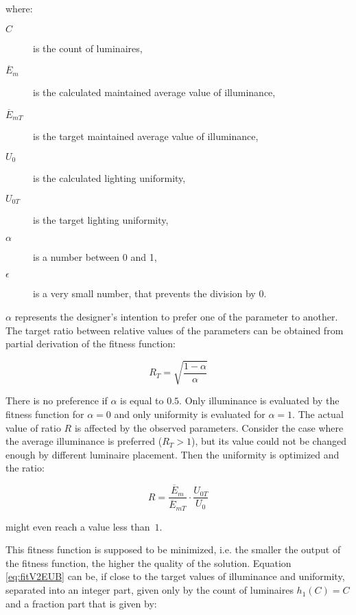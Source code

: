 \noindent where:
\begin{description}
	\item[$C$] is the count of luminaires,
	\item[$\overline{E}_{m}$] is the calculated maintained average value of illuminance,
	\item[$\overline{E}_{mT}$] is the target maintained average value of illuminance,
	\item[$U_0$] is the calculated lighting uniformity,
	\item[$U_{0T}$] is the target lighting uniformity,
	\item[$\alpha$] is a number between 0 and 1,
	\item[$\epsilon$] is a very small number, that prevents the division by 0.
\end{description}

$\alpha$ represents the designer's intention to prefer one of the parameter to another. The target ratio between relative values of the parameters can be obtained from partial derivation of the fitness function:

\begin{equation}
\label{eq:fitV2targetRatio}
R_T =\sqrt{\frac{1-\alpha}{\alpha}}
\end{equation}

\noindent There is no preference if $\alpha$ is equal to $0.5$. Only illuminance is evaluated by the fitness function for $\alpha = 0$ and only uniformity is evaluated for $\alpha = 1$. The actual value of ratio $R$ is affected by the observed parameters. Consider the case where the average illuminance is preferred ($R_T > 1$), but its value could not be changed enough by different luminaire placement. Then the uniformity is optimized and the ratio:

\begin{equation}
\label{eq:fitV2ratio}
R =\frac{\overline{E}_{m}}{\overline{E}_{mT}}\cdot\frac{U_{0T}}{U_0}
\end{equation}

\noindent might even reach a value less than~$1$. 

This fitness function is supposed to be minimized, i.e. the smaller the output of the fitness function, the higher the quality of the solution. Equation \ref{eq:fitV2EUB} can be, if close to the target values of illuminance and uniformity, separated into an integer part, given only by the count of luminaires $h_1\left(C\right)= C$ and a fraction part that is given by:

